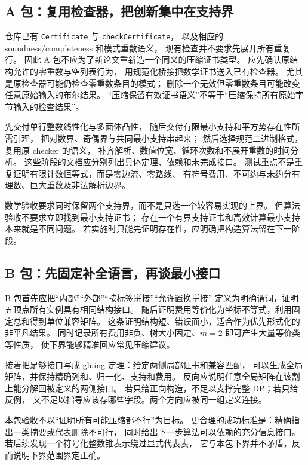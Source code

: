 \documentclass[UTF8,a4paper,11pt,fontset=fandol]{ctexart}
\theoremstyle{definition}
\newcommand{\repo}[1]{\nolinkurl{#1}}
\begin{document}
\subsection{A 包：复用检查器，把创新集中在支持界}

仓库已有 \repo{Certificate} 与 \repo{checkCertificate}，
以及相应的 soundness/completeness 和模式重数语义，
现有检查并不要求先展开所有重复行。
因此 A 包不应为了新论文重新造一个同义的压缩证书类型。
应先确认原结构允许的零重数与空列表行为，
用规范化桥接把数学证书送入已有检查器。
尤其是原检查器可能仍检查零重数条目的模式；
删除一个无效但零重数条目可能改变任意原始输入的布尔结果。
“压缩保留有效证书语义”不等于“压缩保持所有原始字节输入的检查结果”。

先交付单行整数线性化与多面体凸性，
随后交付有限最小支持和平方势存在性所需引理，
把对数界、奇偶界与共同最小支持串起来；
然后选择规范二进制格式，复用原 checker 的语义，
补齐解析、数值位宽、循环次数和不展开重数的时间分析。
这些阶段的文档应分别列出具体定理、依赖和未完成接口。
测试重点不是重复证明有限计数恒等式，而是零边流、零路线、
有符号费用、不可约与未约分有理数、巨大重数及非法解析边界。

数学验收要求同时保留两个支持界，而不是只选一个较容易实现的上界。
但算法验收不要求立即找到最小支持证书；
存在一个有界支持证书和高效计算最小支持本来就是不同问题。
若实施时只能先证明存在性，应明确把构造算法留在下一阶段。

\subsection{B 包：先固定补全语言，再谈最小接口}

B 包首先应把“内部”“外部”“按标签拼接”“允许置换拼接”
定义为明确谓词，证明五顶点所有实例具有相同结构接口。
随后证明费用等价化为坐标不等式，利用固定总和得到单位兼容矩阵。
这条证明结构短、错误面小，适合作为优先形式化的非平凡结果。
同时记录所有费用非负、树大小固定、$m=2$ 即可产生大量等价类等性质，
使下界能够精准回应常见压缩建议。

接着把足够接口写成 gluing 定理：给定两侧局部证书和兼容匹配，
可以生成全局矩阵，并保持精确列和、归一化、支持和费用。
反向应说明任意全局矩阵在该割上能分解回被定义的两侧接口。
若只给正向构造，不足以支撑完整 DP；若只给反例，
又不足以指导应该存哪些字段。两个方向应被同一组定义连接。

本包验收不以“证明所有可能压缩都不行”为目标。
更合理的成功标准是：精确指出一类摘要或代表删除不可行，
同时给出下一步算法可以依赖的充分信息接口。
若后续发现一个符号化整数锥表示绕过显式代表表，
它与本包下界并不矛盾，反而说明下界范围界定正确。
\end{document}
